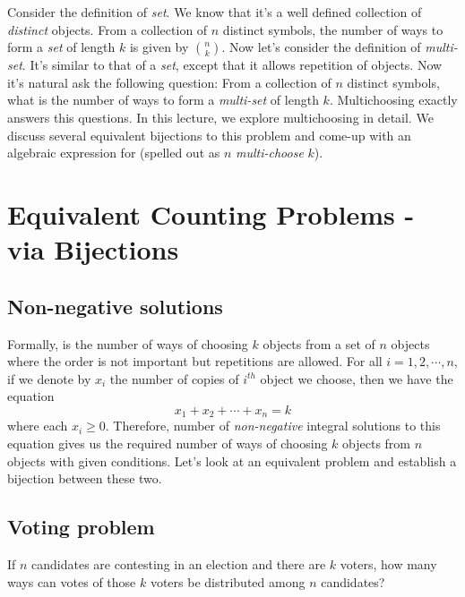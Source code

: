 
Consider the definition of \emph{set}. We know that it's a well defined collection of \emph{distinct} objects. From a collection of $n$ distinct symbols, the number of ways to form a \emph{set} of length $k$ is given by $\binom{n}{k}$. Now let's consider the definition of \emph{multi-set}. It's similar to that of a \emph{set}, except that it allows repetition of objects. Now it's natural ask the following question: From a collection of $n$ distinct symbols, what is the number of ways to form a \emph{multi-set} of length $k$. Multichoosing exactly answers this questions. In this lecture, we explore multichoosing in detail. We discuss several equivalent bijections to this problem and come-up with an algebraic expression for  (spelled out as $n$ \emph{multi-choose} $k$).

\section{Equivalent Counting Problems - via Bijections} \label{sec:equi-bij}
\subsection{Non-negative solutions}\label{non-neq-sol-prob}
Formally,  is the number of ways of choosing $k$ objects from a set of $n$ objects where the order is not important but repetitions are allowed. For all $i=1,2,\cdots,n$, if we denote by $x_i$ the number of copies of $i^{th}$ object we choose, then we have the equation \begin{equation}\label{eqn1}
    x_1+x_2+\cdots+x_n=k
\end{equation} where each $x_i \geq 0$. Therefore, number of \emph{non-negative} integral solutions to this equation gives us the required number of ways of choosing $k$ objects from $n$ objects with given conditions. Let's look at an equivalent problem and establish a bijection between these two.

\subsection{Voting problem}\label{voting-prob} If $n$ candidates are contesting in an election and there are $k$ voters, how many ways can votes of those $k$ voters be distributed among $n$ candidates? 

